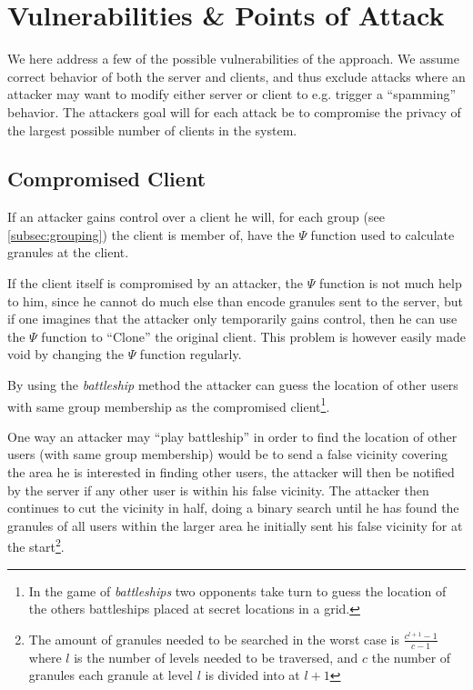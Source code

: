\section{Vulnerabilities \& Points of Attack}\label{sec:vulnerability}
We here address a few of the possible vulnerabilities
of the \vl approach. We assume correct behavior of both
the server and clients, and thus exclude attacks where an
attacker may want to modify either server or client to
e.g. trigger a ``spamming'' behavior.
The attackers goal will for each attack be to 
compromise the privacy of the largest possible number of
clients in the \vl system. 


\subsection{Compromised Client}\label{subsec:VulClient}
If an attacker gains control over a client
he will, for each group (see \ref{subsec:grouping})
the client is member of, have the $\Psi$ function 
used to calculate granules at the client.

If the client itself is compromised by an attacker, the $\Psi$ function
is not much help to him, since he cannot do much else than encode granules
sent to the server, but if one imagines that the attacker only temporarily
gains control, then he can use the $\Psi$ function to ``Clone'' the original
client. This problem is however easily made void by changing the $\Psi$ 
function regularly.

By using the \textit{battleship} method 
the attacker can guess the location of other users with same group 
membership as the compromised client\footnote{In the game of \textit{battleships} 
two opponents take turn to guess the location of the others battleships placed at 
secret locations in a grid.}.

One way an attacker may ``play battleship'' in order to find the location of
other users (with same group membership) would be to send a 
false vicinity covering the area he is interested in finding
other users, the attacker will then be notified by the server if any other 
user is within his false vicinity. The attacker then continues to cut the vicinity in half,
doing a binary search until he has found the granules of all users within the larger area
he initially sent his false vicinity for at the start\footnote{The amount of 
granules needed to be searched in the worst case is $\frac{c^{l+1}-1}{c-1}$ 
where $l$ is the number of levels needed to be traversed, and $c$ the number 
of granules each granule at level $l$ is divided into at $l+1$}.

